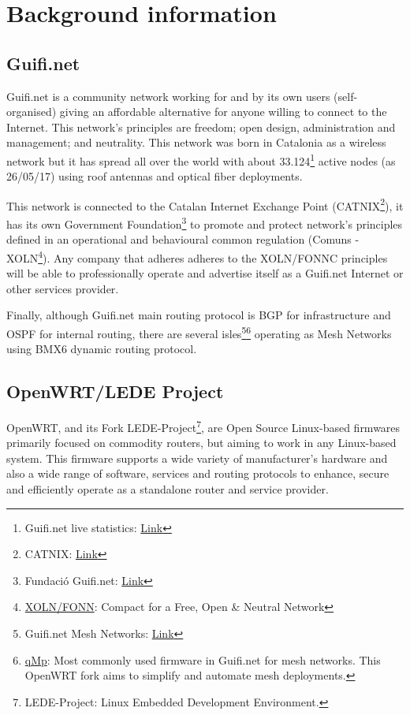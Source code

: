 \section{Background information}
\label{sec:backc}
\subsection{Guifi.net}
\label{subsec:gn}
Guifi.net is a community network working for and by its own users (self-organised) giving an affordable alternative for anyone willing to connect to the Internet. This network's principles are freedom; open design, administration and management; and neutrality. This network was born in Catalonia as a wireless network but it has spread all over the world with about 33.124\footnote{Guifi.net live statistics: \href{https://guifi.net/guifi/menu/stats/nodes}{Link}} active nodes (as 26/05/17) using roof antennas and optical fiber deployments.

This network is connected to the Catalan Internet Exchange Point (CATNIX\footnote{CATNIX: \href{http://www.catnix.net/en/}{Link}}), it has its own Government Foundation\footnote{Fundació Guifi.net: \href{https://fundacio.guifi.net/Foundation}{Link}} to promote and protect network's principles defined in an operational and behavioural common regulation (Comuns - XOLN\footnote{\href{https://guifi.net/en/FONNC}{XOLN/FONN}: Compact for a Free, Open \& Neutral Network}). Any company that adheres adheres to the XOLN/FONNC principles will be able to professionally operate and advertise itself as a Guifi.net Internet or other services provider.

Finally, although Guifi.net main routing protocol is BGP for infrastructure and OSPF for internal routing, there are several isles\footnote{Guifi.net Mesh Networks: \href{http://ca.wiki.guifi.net/wiki/Annex:subxarxes_mesh}{Link}}\footnote{\href{http://qmp.party/Documentation}{qMp}: Most commonly used firmware in Guifi.net for mesh networks. This OpenWRT fork aims to simplify and automate mesh deployments.} operating as Mesh Networks using BMX6 dynamic routing protocol.

\subsection{OpenWRT/LEDE Project}
\label{subsec:owrtlp}
OpenWRT, and its Fork LEDE-Project\footnote{LEDE-Project: Linux Embedded Development Environment.}, are Open Source Linux-based firmwares primarily focused on commodity routers, but aiming to work in any Linux-based system. This firmware supports a wide variety of manufacturer's hardware and also a wide range of software, services and routing protocols to enhance, secure and efficiently operate as a standalone router and service provider.

